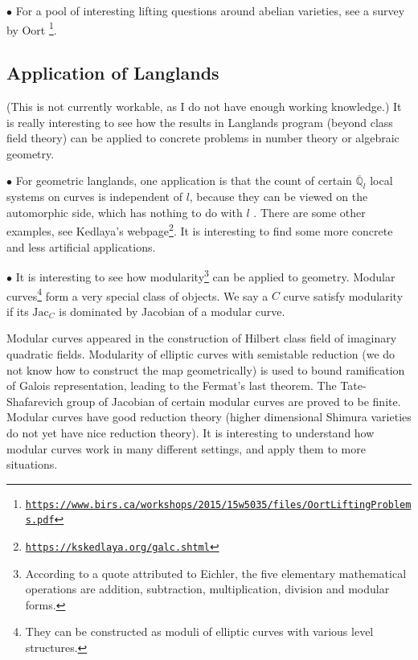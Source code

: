 \documentclass[8pt]{amsart}
\begin{document}
$\bullet$ For a pool of interesting lifting questions around abelian varieties, see a survey by Oort \footnote{\href{https://www.birs.ca/workshops/2015/15w5035/files/OortLiftingProblems.pdf}{\texttt{https://www.birs.ca/workshops/2015/15w5035/files/OortLiftingProblems.pdf}}}.

\subsection{Application of Langlands}
(This is not currently workable, as I do not have enough working knowledge.) It is really interesting to see how the results in Langlands program (beyond class field theory) can be applied to concrete problems in number theory or algebraic geometry.

$\bullet$ For geometric langlands, one application is that the count of certain $\overline{\mathbb{Q}}_l$ local systems on curves is independent of $l$, because they can be viewed on the automorphic side, which has nothing to do with $l$ \cite{Dri}. There are some other examples, see Kedlaya's webpage\footnote{\href{https://kskedlaya.org/galc.shtml}{\texttt{https://kskedlaya.org/galc.shtml}}}. It is interesting to find some more concrete and less artificial applications.

$\bullet$ It is interesting to see how modularity\footnote{According to a quote attributed to Eichler, the five elementary mathematical operations are addition, subtraction, multiplication, division and modular forms.} can be applied to geometry. Modular curves\footnote{They can be constructed as moduli of elliptic curves with various level structures.} form a very special class of objects. We say a $C$ curve satisfy modularity if its $\mathrm{Jac}_C$ is dominated by Jacobian of a modular curve.

Modular curves appeared in the construction of Hilbert class field of imaginary quadratic fields. Modularity of elliptic curves with semistable reduction (we do not know how to construct the map geometrically) is used to bound ramification of Galois representation, leading to the Fermat's last theorem. The Tate-Shafarevich group of Jacobian of certain modular curves are proved to be finite. Modular curves have good reduction theory (higher dimensional Shimura varieties do not yet have nice reduction theory). It is interesting to understand how modular curves work in many different settings, and apply them to more situations.
\end{document}
